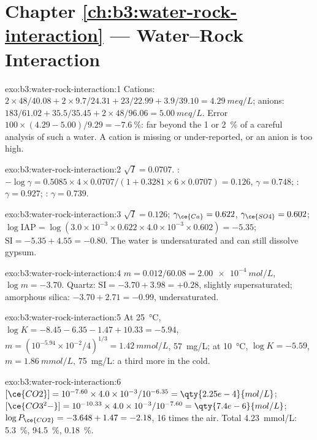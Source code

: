 \section*{Chapter \ref{ch:b3:water-rock-interaction} --- Water--Rock Interaction}

\begin{solution}{exo:b3:water-rock-interaction:1}
Cations: $2\times48/40.08 + 2\times9.7/24.31 + 23/22.99 + 3.9/39.10 =
\qty{4.29}{meq/L}$; anions: $183/61.02 + 35.5/35.45 + 2\times48/96.06 =
\qty{5.00}{meq/L}$. Error $100\times(4.29 - 5.00)/9.29 = \qty{-7.6}{\percent}$:
far beyond the 1 or \qty{2}{\percent} of a careful analysis of such a water.
A cation is missing or under-reported, or an anion is too high.
\end{solution}

\begin{solution}{exo:b3:water-rock-interaction:2}
$\sqrt I = 0.0707$. : $-\log\gamma = 0.5085\times4\times0.0707/(1 +
0.3281\times6\times0.0707) = 0.126$, $\gamma = 0.748$; : $\gamma =
0.927$; : $\gamma = 0.739$.
\end{solution}

\begin{solution}{exo:b3:water-rock-interaction:3}
$\sqrt I = 0.126$; $\gamma_{\ce{Ca}} = 0.622$, $\gamma_{\ce{SO4}} = 0.602$;
$\log\mathrm{IAP} = \log(3.0\times10^{-3}\times0.622\times4.0\times10^{-3}
\times0.602) = -5.35$; $\mathrm{SI} = -5.35 + 4.55 = -0.80$. The water is
undersaturated and can still dissolve gypsum.
\end{solution}

\begin{solution}{exo:b3:water-rock-interaction:4}
$m = 0.012/60.08 = \qty{2.00e-4}{mol/L}$, $\log m = -3.70$. Quartz:
$\mathrm{SI} = -3.70 + 3.98 = +0.28$, slightly supersaturated; amorphous
silica: $-3.70 + 2.71 = -0.99$, undersaturated.
\end{solution}

\begin{solution}{exo:b3:water-rock-interaction:5}
At \qty{25}{\celsius}, $\log K = -8.45 - 6.35 - 1.47 + 10.33 = -5.94$, $m =
(10^{-5.94}\times10^{-2}/4)^{1/3} = \qty{1.42}{mmol/L}$, \qty{57}{mg/L}; at
\qty{10}{\celsius}, $\log K = -5.59$, $m = \qty{1.86}{mmol/L}$,
\qty{75}{mg/L}: a third more in the cold.
\end{solution}

\begin{solution}{exo:b3:water-rock-interaction:6}
$[\ce{CO2}] = 10^{-7.60}\times4.0\times10^{-3}/10^{-6.35} =
\qty{2.25e-4}{mol/L}$; $[\ce{CO3^2-}] = 10^{-10.33}\times4.0\times10^{-3}/
10^{-7.60} = \qty{7.4e-6}{mol/L}$; $\log P_{\ce{CO2}} = -3.648 + 1.47 =
-2.18$, 16 times the air. Total \qty{4.23}{mmol/L}: 
\qty{5.3}{\percent},  \qty{94.5}{\percent}, 
\qty{0.18}{\percent}.
\end{solution}

